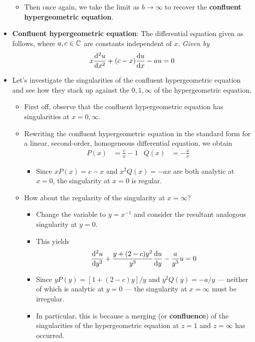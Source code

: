 \documentclass[../finalProject.tex]{subfiles}
\begin{document}
\begin{itemize}
\begin{itemize}
        \item Then once again, we take the limit as $b\to\infty$ to recover the \textbf{confluent hypergeometric equation}.
    \end{itemize}
    \item \textbf{Confluent hypergeometric equation}: The differential equation given as follows, where $a,c\in\mathbb{C}$ are constants independent of $x$. \emph{Given by}
    \begin{equation*}
        x\dv[2]{u}{x}+(c-x)\dv{u}{x}-au = 0
    \end{equation*}
    \item Let's investigate the singularities of the confluent hypergeometric equation and see how they stack up against the $0,1,\infty$ of the hypergeometric equation.
    \begin{itemize}
        \item First off, observe that the confluent hypergeometric equation has singularities at $x=0,\infty$.
        \item Rewriting the confluent hypergeometric equation in the standard form for a linear, second-order, homogeneous differential equation, we obtain
        \begin{align*}
            P(x) &= \frac{c}{x}-1&
            Q(x) &= -\frac{a}{x}
        \end{align*}
        \begin{itemize}
            \item Since $xP(x)=c-x$ and $x^2Q(x)=-ax$ are both analytic at $x=0$, the singularity at $x=0$ is regular.
        \end{itemize}
        \item How about the regularity of the singularity at $x=\infty$?
        \begin{itemize}
            \item Change the variable to $y=x^{-1}$ and consider the resultant analogous singularity at $y=0$.
            \item This yields
            \begin{equation*}
                \dv[2]{u}{y}+\frac{y+(2-c)y^2}{y^3}\dv{u}{y}-\frac{a}{y^3}u = 0
            \end{equation*}
            \item Since $yP(y)=[1+(2-c)y]/y$ and $y^2Q(y)=-a/y$ --- neither of which is analytic at $y=0$ --- the singularity at $x=\infty$ must be irregular.
            \item In particular, this is because a merging (or \textbf{confluence}) of the singularities of the hypergeometric equation at $z=1$ and $z=\infty$ has occurred.

\end{itemize}
\end{itemize}
\end{itemize}
\end{document}
